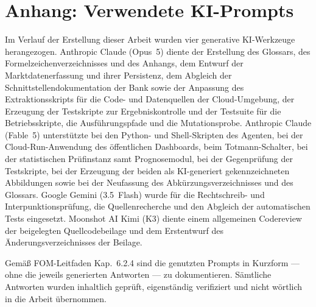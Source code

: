 
\chapter{Anhang: Verwendete KI-Prompts}
\label{cha:anhang-prompts}

Im Verlauf der Erstellung dieser Arbeit wurden vier generative KI-Werkzeuge herangezogen. Anthropic Claude (Opus~5) diente der Erstellung des Glossars, des Formelzeichenverzeichnisses und des Anhangs, dem Entwurf der Marktdatenerfassung und ihrer Persistenz, dem Abgleich der Schnittstellendokumentation der Bank sowie der Anpassung des Extraktionsskripts für die Code- und Datenquellen der Cloud-Umgebung, der Erzeugung der Testskripte zur Ergebniskontrolle und der Testsuite für die Betriebsskripte, die Ausführungspfade und die Mutationsprobe. Anthropic Claude (Fable~5) unterstützte bei den Python- und Shell-Skripten des Agenten, bei der Cloud-Run-Anwendung des öffentlichen Dashboards, beim Totmann-Schalter, bei der statistischen Prüfinstanz samt Prognosemodul, bei der Gegenprüfung der Testskripte, bei der Erzeugung der beiden als KI-generiert gekennzeichneten Abbildungen sowie bei der Neufassung des Abkürzungsverzeichnisses und des Glossars. Google Gemini (3.5~Flash) wurde für die Rechtschreib- und Interpunktionsprüfung, die Quellenrecherche und den Abgleich der automatischen Tests eingesetzt. Moonshot AI Kimi (K3) diente einem allgemeinen Codereview der beigelegten Quellcodebeilage und dem Erstentwurf des Änderungsverzeichnisses der Beilage.

Gemäß FOM-Leitfaden Kap.~6.2.4 sind die genutzten Prompts in Kurzform — ohne die jeweils generierten Antworten — zu dokumentieren. Sämtliche Antworten wurden inhaltlich geprüft, eigenständig verifiziert und nicht wörtlich in die Arbeit übernommen.

\newcommand{\kiwerkzeug}[3]{%
    \paragraph*{Verwendetes Tool}
    \begin{description}[leftmargin=2.5cm,style=nextline,labelwidth=2cm]
        \item[Tool] #1
        \item[Version] #2
        \item[Zugriff] \url{#3}
    \end{description}%
}

